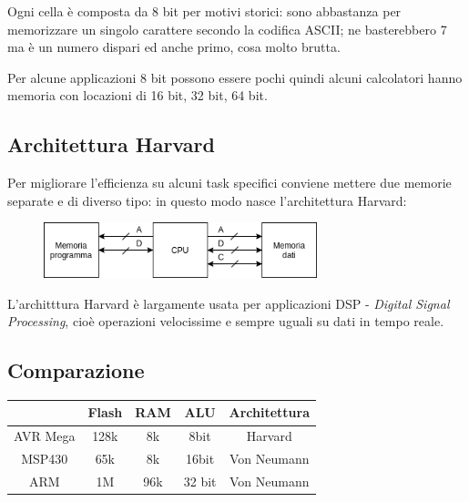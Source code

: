 Ogni cella è composta da 8 bit per motivi storici: sono abbastanza per memorizzare un singolo carattere secondo la codifica ASCII; ne basterebbero 7 ma è un numero dispari ed anche primo, cosa molto brutta.

Per alcune applicazioni 8 bit possono essere pochi quindi alcuni calcolatori hanno memoria con locazioni di 16 bit, 32 bit, 64 bit.

\subsection{Architettura Harvard}
Per migliorare l'efficienza su alcuni task specifici conviene mettere due memorie separate e di diverso tipo: in questo modo nasce l'architettura Harvard:
\begin{figure}[H]
    \centering
    \includegraphics[width=300px]{images/2_Architetture/Harvard.png}
\end{figure}
 L'architttura Harvard è largamente usata per applicazioni DSP - \emph{Digital Signal Processing}, cioè operazioni velocissime e sempre uguali su dati in tempo reale.

\subsection{Comparazione}
\begin{table}[ht]
    \centering
    \begin{tabular}{c|c|c|c|c}
        & Flash & RAM & ALU & Architettura\\
        \hline
        AVR Mega & 128k & 8k & 8bit & Harvard \\
        MSP430 & 65k & 8k & 16bit & Von Neumann \\
        ARM & 1M & 96k & 32 bit & Von Neumann 
    \end{tabular}
\end{table}